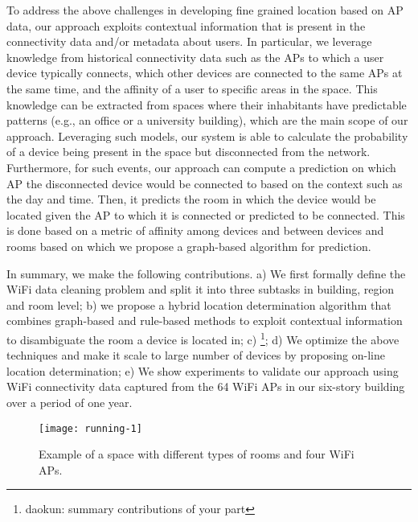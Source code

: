 To address the above challenges in developing fine grained location based on AP data, our approach exploits contextual information that is present in the connectivity data and/or metadata about users. In particular, we leverage knowledge from historical connectivity data such as the APs to which a user device typically connects, which other devices are connected to the same APs at the same time, and the affinity of a user to specific areas in the space. This knowledge can be extracted from spaces where their inhabitants have predictable patterns (e.g., an office or a university building), which are the main scope of our approach. Leveraging such models, our system is able to calculate the probability of a device being present in the space but disconnected from the network. Furthermore, for such events, our approach can compute a prediction on which AP the disconnected device would be connected to based on the context such as the day and time. Then, it predicts the room in which the device would be located given the AP to which it is connected or predicted to be connected. This is done based on a metric of affinity among devices and between devices and rooms based on which we propose a graph-based algorithm for prediction. 

In summary, we make the following contributions. a) We first formally define the WiFi data cleaning problem and split it into three subtasks in building, region and room level; b) we propose a hybrid location determination  algorithm that combines graph-based and rule-based methods to exploit contextual information to disambiguate the room a device is located in; c) \footnote{daokun: summary contributions of your part}; d) We optimize the above techniques and make it scale to large number of devices by proposing on-line location determination; e) We show experiments to validate our approach using WiFi connectivity data captured from the 64 WiFi APs in our six-story building over a period of one year. 

\begin{figure}[!htb]
	\centering
	\vspace{-0.8em}
	\texttt{[image: running-1]}
	\caption{Example of a space with different types of rooms and four WiFi APs.}
	\label{fig:running}
\end{figure}

